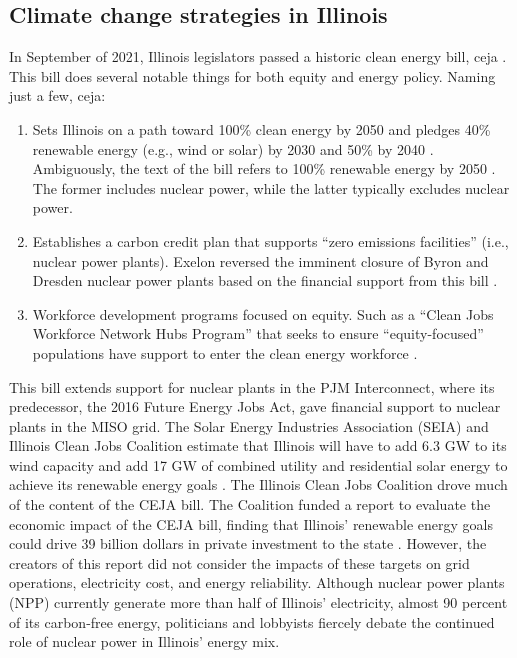 \subsection{Climate change strategies in Illinois}
\label{section:ceja}
In September of 2021, Illinois legislators passed a historic clean energy bill,
\gls{ceja} \cite{harmon_climate_2021}. This bill does several notable things for
both equity and energy policy. Naming just a few, \gls{ceja}:
\begin{enumerate}
  \item Sets Illinois on a path toward 100\% clean energy by 2050 and pledges 40\% renewable
  energy (e.g., wind or solar) by 2030 and 50\% by 2040
  \cite{office_of_governor_jb_pritzker_gov_2021}. Ambiguously,
  the text of the bill refers to 100\% renewable energy by 2050 \cite{harmon_climate_2021}.
  The former includes nuclear power, while the latter typically excludes nuclear power.
  \item Establishes a carbon credit plan that supports “zero emissions facilities”
  (i.e., nuclear power plants). Exelon reversed the imminent closure of Byron and
  Dresden nuclear power plants based on the financial support from this bill
  \cite{brown_two_2021}.
  \item Workforce development programs focused on equity. Such as a
  “Clean Jobs Workforce Network Hubs Program” that seeks to ensure “equity-focused”
  populations have support to enter the clean energy workforce
  \cite{office_of_governor_jb_pritzker_gov_2021}.
\end{enumerate}
This bill extends support for nuclear plants in the PJM Interconnect, where its
predecessor, the 2016 Future Energy Jobs Act, gave financial support to nuclear
plants in the MISO grid. The Solar Energy Industries Association (SEIA) and Illinois
Clean Jobs Coalition estimate that Illinois will have to add 6.3 GW to its wind capacity
and add 17 GW of combined utility and residential solar energy
to achieve its renewable energy goals \cite{goeller_new_2021, the_accelerate_group_clean_2019}.
The Illinois Clean Jobs Coalition
drove much of the content of the CEJA bill. The Coalition funded a report to
evaluate the economic impact of the CEJA bill, finding that Illinois’ renewable
energy goals could drive 39 billion dollars in private investment to the state
\cite{the_accelerate_group_clean_2019}.
However, the creators of this report did not consider the impacts of these targets
on grid operations, electricity cost, and energy reliability. Although nuclear power
plants (NPP) currently generate more than half of Illinois’ electricity, almost
90 percent of its carbon-free energy, politicians and lobbyists fiercely debate the continued
role of nuclear power in Illinois’ energy mix.

